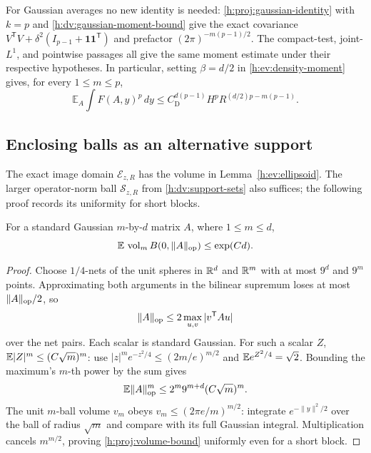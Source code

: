 For Gaussian averages no new identity is needed:
\eqref{h:proj:gaussian-identity} with \(k=p\) and
\eqref{h:dv:gaussian-moment-bound} give the exact covariance
\(V^{\mathsf T}V+\delta^2(I_{p-1}+\mathbf1\mathbf1^{\mathsf T})\)
and prefactor \((2\pi)^{-m(p-1)/2}\).
The compact-test, joint-\(L^1\), and pointwise passages all give the
same moment estimate under their respective hypotheses. In particular,
setting \(\beta=d/2\) in \eqref{h:ev:density-moment} gives, for every
\(1\le m\le p\),
\begin{equation}\label{h:ev:half-ambient-density}
 \mathbb E_A\int F(A,y)^p\,dy
 \le C_{\mathrm D}^{d(p-1)}
       H^pR^{(d/2)p-m(p-1)}.
\end{equation}

\subsection{Enclosing balls as an alternative support}

The exact image domain \(\mathcal E_{z,R}\) has the volume in
Lemma~\ref{h:ev:ellipsoid}. The larger operator-norm ball
\(\mathcal S_{z,R}\) from \eqref{h:dv:support-sets} also suffices;
the following proof records its uniformity for short blocks.

\begin{lemma}\label{h:proj:volume}
For a standard Gaussian \(m\)-by-\(d\) matrix \(A\), where
\(1\le m\le d\),
\begin{equation}\label{h:proj:volume-bound}
 \mathbb E\,\operatorname{vol}_m B(0,\|A\|_{\mathrm{op}})\le\exp(Cd).
\end{equation}
\end{lemma}

\begin{proof}
Choose \(1/4\)-nets of the unit spheres in \(\mathbb R^d\) and \(\mathbb R^m\)
with at most \(9^d\) and \(9^m\) points. Approximating both arguments
in the bilinear supremum loses at most \(\|A\|_{\mathrm{op}}/2\), so
\[
 \|A\|_{\mathrm{op}}\le2\max_{u,v}|v^{\mathsf T}Au|
\]
over the net pairs. Each scalar is standard Gaussian. For such a
scalar \(Z\),
\(\mathbb E|Z|^m\le(C\sqrt m)^m\): use
\(|z|^m e^{-z^2/4}\le(2m/e)^{m/2}\) and
\(\mathbb E e^{Z^2/4}=\sqrt2\). Bounding the maximum's \(m\)-th power
by the sum gives
\[
 \mathbb E\|A\|_{\mathrm{op}}^m\le2^m9^{m+d}(C\sqrt m)^m.
\]
The unit \(m\)-ball volume \(v_m\) obeys
\(v_m\le(2\pi e/m)^{m/2}\): integrate \(e^{-\|y\|^2/2}\)
over the ball of radius \(\sqrt m\) and compare with its full Gaussian
integral. Multiplication cancels \(m^{m/2}\), proving
\eqref{h:proj:volume-bound} uniformly even for a short block.
\end{proof}

